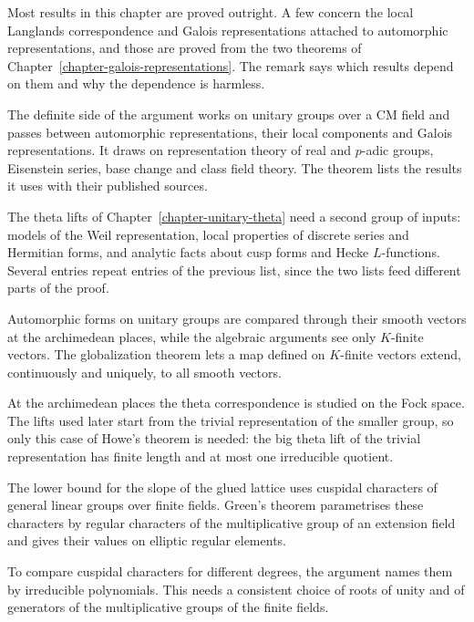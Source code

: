 Most results in this chapter are proved outright. A few concern the local
Langlands correspondence and Galois representations attached to automorphic
representations, and those are proved from the two theorems of
Chapter~\ref{chapter-galois-representations}. The remark says which results
depend on them and why the dependence is harmless.

The definite side of the argument works on unitary groups over a CM field and
passes between automorphic representations, their local components and
Galois representations. It draws on representation theory of real and
$p$-adic groups, Eisenstein series, base change and class field theory. The
theorem lists the results it uses with their published sources.

The theta lifts of Chapter~\ref{chapter-unitary-theta} need a second group of
inputs: models of the Weil representation, local properties of discrete
series and Hermitian forms, and analytic facts about cusp forms and Hecke
$L$-functions. Several entries repeat entries of the previous list, since the
two lists feed different parts of the proof.

Automorphic forms on unitary groups are compared through their smooth vectors
at the archimedean places, while the algebraic arguments see only
$K$-finite vectors. The globalization theorem lets a map defined on
$K$-finite vectors extend, continuously and uniquely, to all smooth vectors.

At the archimedean places the theta correspondence is studied on the Fock
space. The lifts used later start from the trivial representation of the
smaller group, so only this case of Howe's theorem is needed: the big theta
lift of the trivial representation has finite length and at most one
irreducible quotient.

The lower bound for the slope of the glued lattice uses cuspidal characters
of general linear groups over finite fields. Green's theorem
parametrises these characters by regular characters of the multiplicative
group of an extension field and gives their values on elliptic regular
elements.

To compare cuspidal characters for different degrees, the argument names them
by irreducible polynomials. This needs a consistent choice of roots of unity
and of generators of the multiplicative groups of the finite fields.

